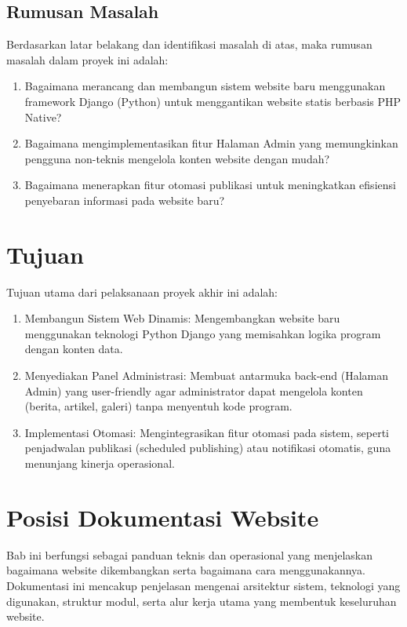 \subsection{Rumusan Masalah}
Berdasarkan latar belakang dan identifikasi masalah di atas, maka rumusan masalah dalam proyek ini adalah:
\begin{enumerate}
\item Bagaimana merancang dan membangun sistem website baru menggunakan framework Django (Python) untuk menggantikan website statis berbasis PHP Native?
\item Bagaimana mengimplementasikan fitur Halaman Admin yang memungkinkan pengguna non-teknis mengelola konten website dengan mudah?
\item Bagaimana menerapkan fitur otomasi publikasi untuk meningkatkan efisiensi penyebaran informasi pada website baru?
\end{enumerate}
\section{Tujuan}
Tujuan utama dari pelaksanaan proyek akhir ini adalah:
\begin{enumerate}
    \item Membangun Sistem Web Dinamis: Mengembangkan website baru menggunakan teknologi Python Django yang memisahkan logika program dengan konten data.
    \item Menyediakan Panel Administrasi: Membuat antarmuka back-end (Halaman Admin) yang user-friendly agar administrator dapat mengelola konten (berita, artikel, galeri) tanpa menyentuh kode program.
    \item Implementasi Otomasi: Mengintegrasikan fitur otomasi pada sistem, seperti penjadwalan publikasi (scheduled publishing) atau notifikasi otomatis, guna menunjang kinerja operasional.
\end{enumerate}

\section{Posisi Dokumentasi Website}

Bab ini berfungsi sebagai panduan teknis dan operasional yang menjelaskan bagaimana website dikembangkan serta bagaimana cara menggunakannya. Dokumentasi ini mencakup penjelasan mengenai arsitektur sistem, teknologi yang digunakan, struktur modul, serta alur kerja utama yang membentuk keseluruhan website.

